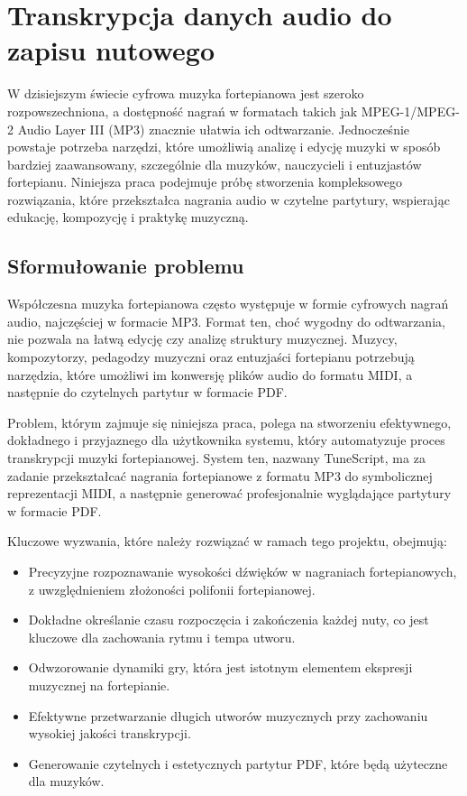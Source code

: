 \documentclass[a4paper,twoside,12pt]{book}
\begin{document}
\chapter{Transkrypcja danych audio do zapisu nutowego}
\label{ch:analiza}
W dzisiejszym świecie cyfrowa muzyka fortepianowa jest szeroko rozpowszechniona, a dostępność nagrań w formatach takich jak MPEG-1/MPEG-2 Audio Layer III (MP3) znacznie ułatwia ich odtwarzanie. Jednocześnie powstaje potrzeba narzędzi, które umożliwią analizę i edycję muzyki w sposób bardziej zaawansowany, szczególnie dla muzyków, nauczycieli i entuzjastów fortepianu. Niniejsza praca podejmuje próbę stworzenia kompleksowego rozwiązania, które przekształca nagrania audio w czytelne partytury, wspierając edukację, kompozycję i praktykę muzyczną. 

\section{Sformułowanie problemu}

Współczesna muzyka fortepianowa często występuje w formie cyfrowych nagrań audio, najczęściej w formacie MP3. Format ten, choć wygodny do odtwarzania, nie pozwala na łatwą edycję czy analizę struktury muzycznej. Muzycy, kompozytorzy, pedagodzy muzyczni oraz entuzjaści fortepianu potrzebują narzędzia, które umożliwi im konwersję plików audio do formatu MIDI, a następnie do czytelnych partytur w formacie PDF. 

Problem, którym zajmuje się niniejsza praca, polega na stworzeniu efektywnego, dokładnego i przyjaznego dla użytkownika systemu, który automatyzuje proces transkrypcji muzyki fortepianowej. System ten, nazwany TuneScript, ma za zadanie przekształcać nagrania fortepianowe z formatu MP3 do symbolicznej reprezentacji MIDI, a następnie generować profesjonalnie wyglądające partytury w formacie PDF.

Kluczowe wyzwania, które należy rozwiązać w ramach tego projektu, obejmują:

\begin{itemize}
	\item Precyzyjne rozpoznawanie wysokości dźwięków w nagraniach fortepianowych, z uwzględnieniem złożoności polifonii fortepianowej.
	\item Dokładne określanie czasu rozpoczęcia i zakończenia każdej nuty, co jest kluczowe dla zachowania rytmu i tempa utworu.
	\item Odwzorowanie dynamiki gry, która jest istotnym elementem ekspresji muzycznej na fortepianie.
	\item Efektywne przetwarzanie długich utworów muzycznych przy zachowaniu wysokiej jakości transkrypcji.
	\item Generowanie czytelnych i estetycznych partytur PDF, które będą użyteczne dla muzyków.
\end{itemize}
\end{document}
